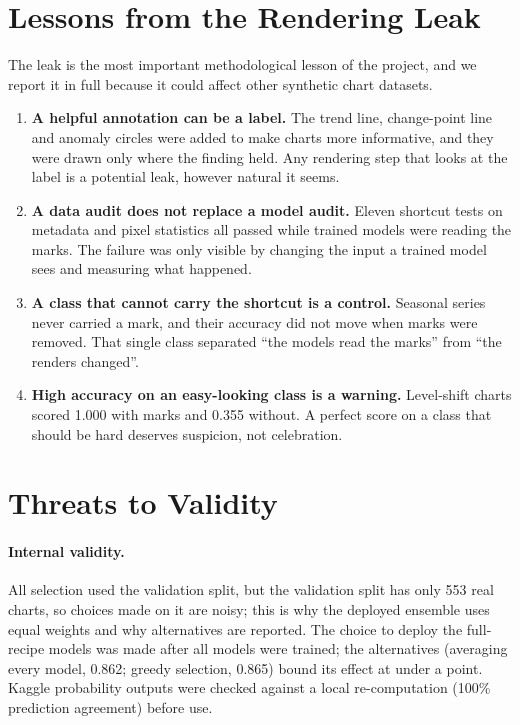 \section{Lessons from the Rendering Leak}

The leak is the most important methodological lesson of the project, and we report it
in full because it could affect other synthetic chart datasets.

\begin{enumerate}[leftmargin=1.4em]
  \item \textbf{A helpful annotation can be a label.} The trend line, change-point line
  and anomaly circles were added to make charts more informative, and they were drawn
  only where the finding held. Any rendering step that looks at the label is a potential
  leak, however natural it seems.
  \item \textbf{A data audit does not replace a model audit.} Eleven shortcut tests on
  metadata and pixel statistics all passed while trained models were reading the marks.
  The failure was only visible by changing the input a trained model sees and measuring
  what happened.
  \item \textbf{A class that cannot carry the shortcut is a control.} Seasonal series
  never carried a mark, and their accuracy did not move when marks were removed. That
  single class separated ``the models read the marks'' from ``the renders changed''.
  \item \textbf{High accuracy on an easy-looking class is a warning.} Level-shift charts
  scored 1.000 with marks and 0.355 without. A perfect score on a class that should be
  hard deserves suspicion, not celebration.
\end{enumerate}

\section{Threats to Validity}

\paragraph{Internal validity.} All selection used the validation split, but the
validation split has only 553 real charts, so choices made on it are noisy; this is why
the deployed ensemble uses equal weights and why alternatives are reported. The choice to
deploy the full-recipe models was made after all models were trained; the alternatives
(averaging every model, 0.862; greedy selection, 0.865) bound its effect at under a
point. Kaggle probability outputs were checked against a local re-computation (100\%
prediction agreement) before use.


